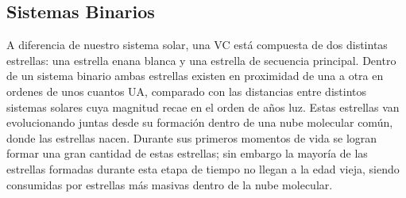 \subsection*{Sistemas Binarios}

A diferencia de nuestro sistema solar, una VC está compuesta de dos distintas
estrellas: una estrella enana blanca y una estrella de secuencia principal.
Dentro de un sistema binario ambas estrellas existen en proximidad de una a otra
en ordenes de unos cuantos UA, comparado con las distancias entre distintos
sistemas solares cuya magnitud recae en el orden de años luz. Estas estrellas
van evolucionando juntas desde su formación dentro de una nube molecular común,
donde las estrellas nacen. Durante sus primeros momentos de vida se logran
formar una gran cantidad de estas estrellas; sin embargo la mayoría de las
estrellas formadas durante esta etapa de tiempo no llegan a la edad vieja,
siendo consumidas por estrellas más masivas dentro de la nube molecular. 